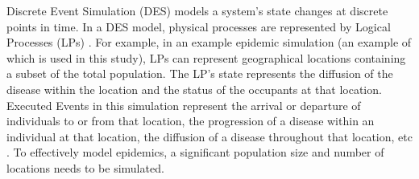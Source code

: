 \documentclass{sig-alternate}
\begin{document}
Discrete Event Simulation (DES) models a system's state changes at discrete points in
time.  In a DES model, physical processes are represented by Logical Processes (LPs)
\cite{des_misra}.  For example, in an example epidemic simulation (an example of which is
used in this study), LPs can represent geographical locations containing a subset of the
total population.  The LP's state represents the diffusion of the disease within the
location and the status of the occupants at that location.  Executed Events in this
simulation represent the arrival or departure of individuals to or from that location, the
progression of a disease within an individual at that location, the diffusion of a disease
throughout that location, etc \cite{epidemic}.  To effectively model epidemics, a
significant population size and number of locations needs to be simulated.
\end{document}
